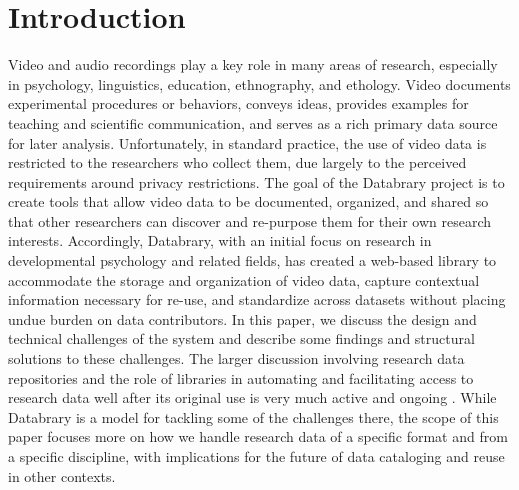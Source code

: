 \documentclass{sig-alternate}
\begin{document}


\section{Introduction}


Video and audio recordings play a key role in many areas of research, especially in psychology, linguistics, education, ethnography, and ethology.
Video documents experimental procedures or behaviors, conveys ideas, provides examples for teaching and scientific communication, and serves as a rich primary data source for later analysis.
Unfortunately, in standard practice, the use of video data is restricted to the researchers who collect them, due largely to the perceived requirements around privacy restrictions.
The goal of the Databrary project is to create tools that allow video data to be documented, organized, and shared so that other researchers can discover and re-purpose them for their own research interests.
Accordingly, Databrary, with an initial focus on research in developmental psychology and related fields, has created a web-based library to accommodate the storage and organization of video data, capture contextual information necessary for re-use, and standardize across datasets without placing undue burden on data contributors.
In this paper, we discuss the design and technical challenges of the system and describe some findings and structural solutions to these challenges. The larger discussion involving research data repositories and the role of libraries in automating and facilitating access to research data well after its original use is very much active and ongoing \cite{Castelli_etal_2013, Nielson_Hjørland_2014, Macmillan_2014}. While Databrary is a model for tackling some of the challenges there, the scope of this paper focuses more on how we handle research data of a specific format and from a specific discipline, with implications for the future of data cataloging and reuse in other contexts.
\end{document}

